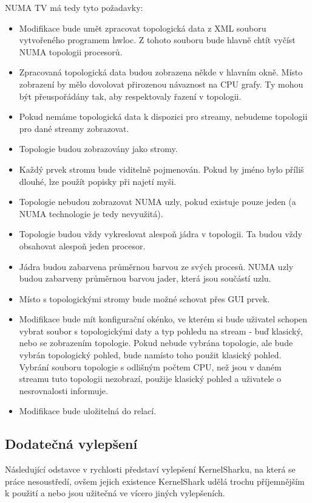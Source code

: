 NUMA TV má tedy tyto požadavky:
\begin{itemize}
    \item Modifikace bude umět zpracovat topologická data z XML souboru vytvořeného programem hwloc. Z tohoto souboru bude hlavně chtít vyčíst NUMA topologii procesorů.
    \item Zpracovaná topologická data budou zobrazena někde v hlavním okně. Místo zobrazení by mělo dovolovat přirozenou návaznost na CPU grafy. Ty mohou být přeuspořádány tak, aby respektovaly řazení v topologii.
    \item Pokud nemáme topologická data k dispozici pro streamy, nebudeme topologii pro dané streamy zobrazovat.
    \item Topologie budou zobrazovány jako stromy.
    \item Každý prvek stromu bude viditelně pojmenován. Pokud by jméno bylo příliš dlouhé, lze použít popisky při najetí myši.
    \item Topologie nebudou zobrazovat NUMA uzly, pokud existuje pouze jeden (a NUMA technologie je tedy nevyužitá).
    \item Topologie budou vždy vykreslovat alespoň jádra v topologii. Ta budou vždy obsahovat alespoň jeden procesor.
    \item Jádra budou zabarvena průměrnou barvou ze svých procesů. NUMA uzly budou zabarveny průměrnou barvou jader, která jsou součástí uzlu.
    \item Místo s topologickými stromy bude možné schovat přes GUI prvek.
    \item Modifikace bude mít konfigurační okénko, ve kterém si bude uživatel schopen vybrat soubor s topologickými daty a typ pohledu na stream - buď klasický, nebo se zobrazením topologie. Pokud nebude vybrána topologie, ale bude vybrán topologický pohled, bude namísto toho použit klasický pohled. Vybrání souboru topologie s odlišným počtem CPU, než jsou v daném streamu tuto topologii nezobrazí, použije klasický pohled a uživatele o nesrovnalosti informuje.
    \item Modifikace bude uložitelná do relací.
\end{itemize}

\subsection{Dodatečná vylepšení}

Následující odstavce v rychlosti představí vylepšení KernelSharku, na která se práce nesoustředí, ovšem jejich existence KernelShark udělá trochu příjemnějším k použití a nebo jsou užitečná ve vícero jiných vylepšeních.

